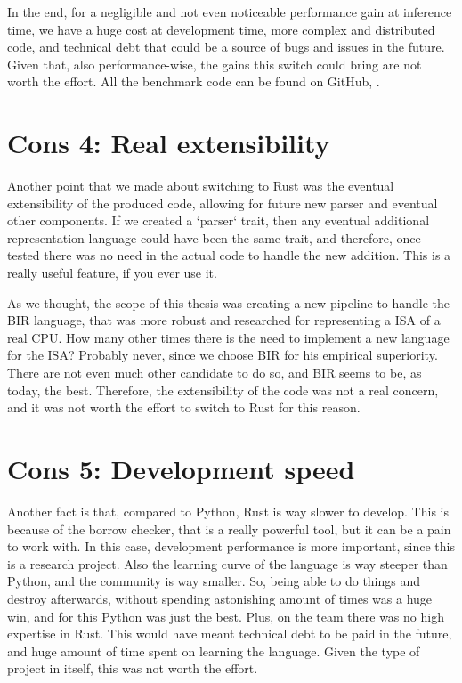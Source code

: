 In the end, for a negligible and not even noticeable performance gain at inference
time, we have a huge cost at development time, more complex and distributed code,
and technical debt that could be a source of bugs and issues in the future. Given
that, also performance-wise, the gains this switch could bring are not worth the
effort. All the benchmark code can be found on GitHub, \cite{benchmark}.

\section[Real extensibility]{Cons 4: Real extensibility}
Another point that we made about switching to Rust was the eventual extensibility
of the produced code, allowing for future new parser and eventual other
components. If we created a `parser` trait, then any eventual additional
representation language could have been the same trait, and therefore, once
tested there was no need in the actual code to handle the new addition. This is a
really useful feature, if you ever use it.

As we thought, the scope of this thesis was creating a new pipeline to handle the
BIR language, that was more robust and researched for representing a ISA of a
real CPU. How many other times there is the need to implement a new language for
the ISA? Probably never, since we choose BIR for his empirical superiority.
There are not even much other candidate to do so, and BIR seems to be, as today,
the best. Therefore, the extensibility of the code was not a real concern, and
it was not worth the effort to switch to Rust for this reason.

\section[Development speed]{Cons 5: Development speed}
Another fact is that, compared to Python, Rust is way slower to develop. This is
because of the borrow checker, that is a really powerful tool, but it can be a pain
to work with. In this case, development performance is more important, since
this is a research project. Also the learning curve of the language is way steeper
than Python, and the community is way smaller. So, being able to do things and
destroy afterwards, without spending astonishing amount of times was a huge win,
and for this Python was just the best. Plus, on the team there was no high
expertise in Rust. This would have meant technical debt to be paid in the future,
and huge amount of time spent on learning the language. Given the type of project
in itself, this was not worth the effort.

